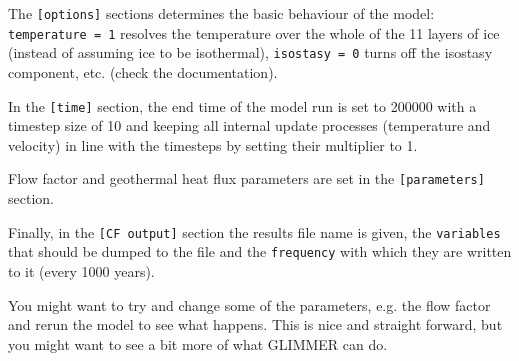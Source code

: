 The \texttt{[options]} sections determines the basic behaviour of the model:\\
\texttt{temperature = 1} resolves the temperature over the whole of the 11
layers of ice (instead of assuming ice to be isothermal), \texttt{isostasy = 0}
turns off the isostasy component, etc. (check the documentation).

In the \texttt{[time]} section, the end time of the model run is set to 200000
with a timestep size of 10 and keeping all internal update processes
(temperature and velocity) in line with the timesteps by setting their
multiplier to 1.

Flow factor and geothermal heat flux parameters are set in the
\texttt{[parameters]} section.

Finally, in the \texttt{[CF output]} section the results file name is given,
the \texttt{variables} that should be dumped to the file and the
\texttt{frequency} with which they are written to it (every 1000 years).

You might want to try and change some of the parameters, e.g. the flow factor
and rerun the model to see what happens. This is nice and straight forward, but
you might want to see a bit more of what GLIMMER can do.
